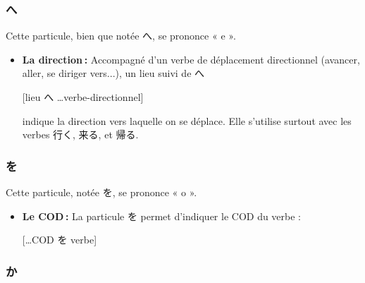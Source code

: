         \subsubsection{へ}

    Cette particule, bien que notée へ, se prononce « e ».

    \begin{itemize}
        \item \textbf{La direction :} Accompagné d'un verbe de déplacement directionnel (avancer, aller, se diriger vers...), un lieu suivi de へ
        \begin{center}
            [lieu へ \dots verbe-directionnel]
        \end{center}
        indique la direction vers laquelle on se déplace. Elle s'utilise surtout avec les verbes 行く, 来る, et 帰る.
    \end{itemize}

        \subsubsection{を}

    Cette particule, notée を, se prononce « o ».

    \begin{itemize}
        \item \textbf{Le COD :} La particule を permet d'indiquer le COD du verbe : 
        \begin{center}
            [\dots COD を verbe]
        \end{center}
    \end{itemize}

        \subsubsection{か}

